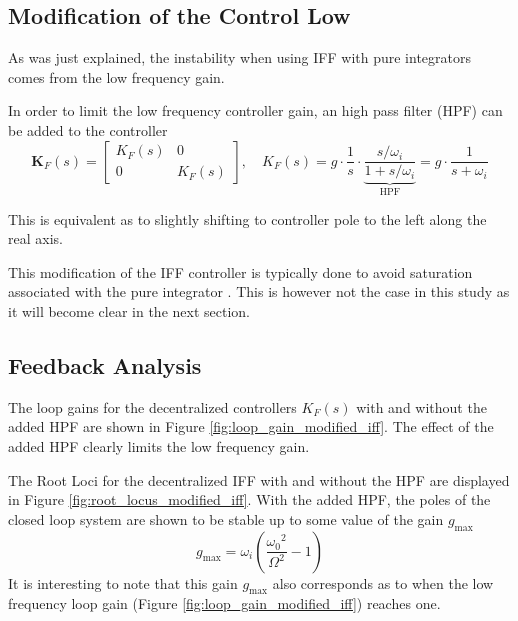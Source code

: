 \documentclass{ISMA_USD2020}
\begin{document}
\subsection{Modification of the Control Low}
\label{sec:org256e76b}
As was just explained, the instability when using IFF with pure integrators comes from the low frequency gain.

In order to limit the low frequency controller gain, an high pass filter (HPF) can be added to the controller
\begin{equation}
\label{eq:IFF_LHF}
  \bm{K}_F(s) = \begin{bmatrix} K_F(s) & 0 \\ 0 & K_F(s) \end{bmatrix}, \quad K_{F}(s) = g \cdot \frac{1}{s} \cdot \underbrace{\frac{s/\omega_i}{1 + s/\omega_i}}_{\text{HPF}} = g \cdot \frac{1}{s + \omega_i}
\end{equation}

This is equivalent as to slightly shifting to controller pole to the left along the real axis.

This modification of the IFF controller is typically done to avoid saturation associated with the pure integrator \cite{preumont91_activ}.
This is however not the case in this study as it will become clear in the next section.

\subsection{Feedback Analysis}
\label{sec:org6765624}
The loop gains for the decentralized controllers \(K_F(s)\) with and without the added HPF are shown in Figure \ref{fig:loop_gain_modified_iff}.
The effect of the added HPF clearly limits the low frequency gain.

The Root Loci for the decentralized IFF with and without the HPF are displayed in Figure \ref{fig:root_locus_modified_iff}.
With the added HPF, the poles of the closed loop system are shown to be stable up to some value of the gain \(g_\text{max}\)
\begin{equation}
\label{eq:gmax_iff_hpf}
  g_{\text{max}} = \omega_i \left( \frac{{\omega_0}^2}{\Omega^2} - 1 \right)
\end{equation}
It is interesting to note that this gain \(g_{\text{max}}\) also corresponds as to when the low frequency loop gain (Figure \ref{fig:loop_gain_modified_iff}) reaches one.
\end{document}
